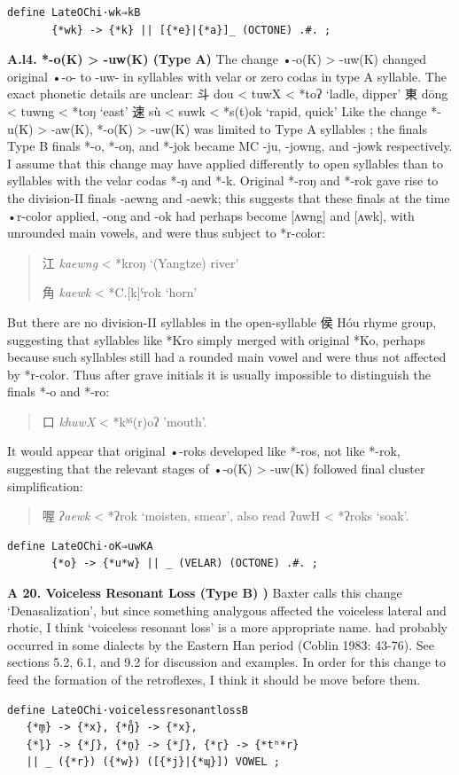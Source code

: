 \documentclass[xetex, svgnames, 12pt]{scrartcl}
\newcounter{para}
\newcommand\mypara[1]{\par\refstepcounter{para}\textbf{\thepara\space#1\space}}
\begin{document}
\begin{verbatim}
define LateOChi·wk⇒kB 
       {*wk} -> {*k} || [{*e}|{*a}]_ (OCTONE) .#. ;
 \end{verbatim}
 
\mypara{A.l4. *-o(K) > -uw(K) (Type A)}
The change •-o(K) > -uw(K) changed original •-o- to -uw- in syllables with velar or zero
 codas in type A syllable. The exact phonetic details are unclear:
 斗 dou < tuwX < *toʔ `ladle, dipper'
 東 dōng < tuwng < *toŋ `east'
 速 sù < suwk < *s(t)ok `rapid, quick'
 Like the change *-u(K) > -aw(K), *-o(K) > -uw(K) was limited to Type A syllables 
 ; the finals Type B finals *-o, *-oŋ, and *-jok became MC -ju, -jowng, and -jowk respectively.
 I assume that this change may have applied differently to open syllables than to syllables
 with the velar codas *-ŋ and *-k. Original *-roŋ and *-rok gave rise to the division-II
 finals -aewng and -aewk; this suggests that these finals at the time •r-color applied, -ong and
 -ok had perhaps become [ʌwng] and [ʌwk], with unrounded main vowels, and were thus
 subject to *r-color:
\begin{quote}
 江 %
 \textit{kaewng} < *kroŋ `(Yangtze) river'

 角 %
 \textit{kaewk} < *C.[k]ˤrok `horn'
\end{quote}
 But there are no division-II syllables in the open-syllable 侯 Hóu rhyme group, suggesting
 that syllables like *Kro simply merged with original *Ko, perhaps because such syllables
 still had a rounded main vowel and were thus not affected by *r-color. Thus after grave
 initials it is usually impossible to distinguish the finals *-o and *-ro:
 \begin{quote}
 口 %
 \textit{khuwX} < *kʰˤ(r)oʔ 'mouth'.
 \end{quote}
 It would appear that original •-roks developed like *-ros, not like *-rok, suggesting that the
 relevant stages of •-o(K) > -uw(K) followed final cluster simplification:
 \begin{quote}
 喔 %
 \textit{ʔaewk} < *ʔrok `moisten, smear', also read ʔuwH < *ʔroks `soak'.
  \end{quote}
 
 \begin{verbatim}
define LateOChi·oK⇒uwKA 
       {*o} -> {*u*w} || _ (VELAR) (OCTONE) .#. ;
 \end{verbatim}

\mypara{A 20. Voiceless Resonant Loss (Type B) \citep[576]{Baxter1992})}
 Baxter calls this change `Denasalization', but since something analygous affected the 
 voiceless lateral and rhotic, I think `voiceless resonant loss' is a more appropriate name. 
 had probably occurred in some dialects by 
 the Eastern Han period (Coblin 1983: 43-76). See sections 5.2, 6.1,
 and 9.2 for discussion and examples.
 In order for this change to feed the formation of the retroflexes, I think it should be move 
 before them.
\begin{verbatim}
define LateOChi·voicelessresonantlossB
   {*m̥} -> {*x}, {*ŋ̊} -> {*x},
   {*l̥} -> {*ʃ}, {*n̥} -> {*ʃ}, {*r̥} -> {*tʰ*r}
   || _ ({*r}) ({*w}) ([{*j}|{*ɰ}]) VOWEL ;
 \end{verbatim}
\end{document}
